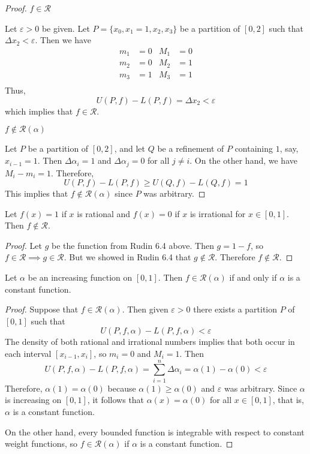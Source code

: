 \documentclass{homework}
\begin{document}
	\begin{proof}
	
	$f \in \mathscr{R}$
	
	Let $\varepsilon >0$ be given. Let $P = \{x_0, x_1=1, x_2, x_3\}$ be a partition of $[0, 2]$ such that $\Delta x_2 < \varepsilon$. Then we have
	$$
	\begin{aligned}
		m_1 &= 0 & M_1 &= 0\\
		m_2 &= 0 & M_2 &= 1\\
		m_3 &= 1 & M_3 &= 1\\
	\end{aligned}
	$$
	Thus,
	$$
	U(P,f) - L(P,f) = \Delta x_2 < \varepsilon
	$$
	which implies that $f \in \mathscr{R}$.
	
	$f \notin \mathscr{R}(\alpha)$
	
	Let $P$ be a partition of $[0, 2]$, and let $Q$ be a refinement of $P$ containing $1$, say, $x_{i-1} = 1$. Then $\Delta \alpha_i = 1$ and $\Delta \alpha_j = 0$ for all $j \ne i$. On the other hand, we have $M_i - m_i = 1$. Therefore,
	$$
	U(P, f) - L(P, f) \ge U(Q, f) - L(Q, f) = 1
	$$
	This implies that $f \notin \mathscr{R}(\alpha)$ since $P$ was arbitrary.
	\end{proof}
	
	
	\begin{alphaparts}
		\questionpart %
	
		Let $f(x) = 1$ if $x$ is rational and $f(x) = 0$ if $x$ is irrational for $x \in [0,1]$. Then $f \notin \mathscr{R}$.
		
		\begin{proof}
			Let $g$ be the function from Rudin 6.4 above. Then $g =  1- f$, so $f\in\mathscr{R}\implies g\in \mathscr{R}$. But we showed in Rudin 6.4 that $g \notin \mathscr{R}$. Therefore $f \notin \mathscr{R}$.
		\end{proof}
		
		\questionpart %
	
		Let $\alpha$ be an increasing function on $[0,1]$. Then $f \in \mathscr{R}(\alpha)$ if and only if $\alpha$ is a constant function.
			
		\begin{proof}
			Suppose that $f \in \mathscr{R}(\alpha)$. Then given $\varepsilon > 0$ there exists a partition $P$ of $[0,1]$ such that
			$$
			U(P,f,\alpha) - L(P,f,\alpha) < \varepsilon
			$$
			The density of both rational and irrational numbers implies that both occur in each interval $[x_{i-1},x_i]$, so $m_i = 0$ and $M_i = 1$. Then 
			$$
			U(P,f,\alpha) - L(P,f,\alpha) = \sum_{i=1}^n\Delta \alpha_i = \alpha(1) - \alpha(0) < \varepsilon
			$$
			Therefore, $\alpha(1) = \alpha(0)$ because $\alpha(1) \ge \alpha(0)$ and $\varepsilon$ was arbitrary. Since $\alpha$ is increasing on $[0,1]$, it follows that $\alpha(x) = \alpha(0)$ for all $x \in [0,1]$, that is, $\alpha$ is a constant function.
			
			On the other hand, every bounded function is integrable with respect to constant weight functions, so $f\in\mathscr{R}(\alpha)$ if $\alpha$ is a constant function.
		\end{proof}
	\end{alphaparts}
		
\end{document}
